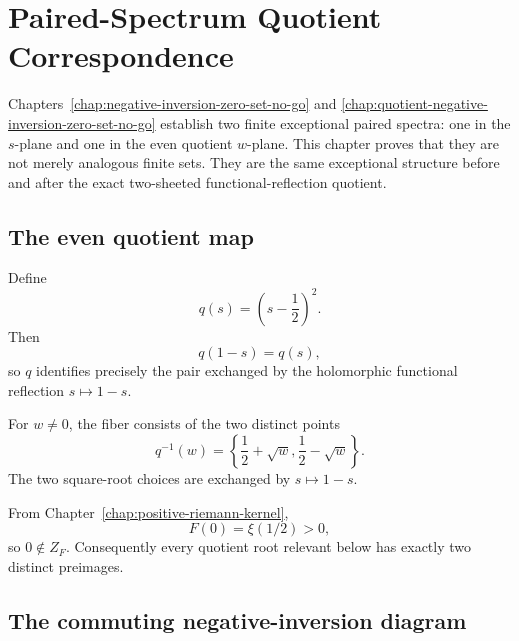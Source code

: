\chapter{Paired-Spectrum Quotient Correspondence}
\label{chap:paired-spectrum-quotient-correspondence}


Chapters~\ref{chap:negative-inversion-zero-set-no-go} and
\ref{chap:quotient-negative-inversion-zero-set-no-go} establish two finite
exceptional paired spectra: one in the $s$-plane and one in the even quotient
$w$-plane.  This chapter proves that they are not merely analogous finite
sets.  They are the same exceptional structure before and after the exact
two-sheeted functional-reflection quotient.

\section{The even quotient map}

Define
\begin{equation}
 q(s)=\left(s-\frac12\right)^2.
 \label{eq:g016-q}
\end{equation}
Then
\begin{equation}
 q(1-s)=q(s),
 \label{eq:g016-reflection-quotient}
\end{equation}
so $q$ identifies precisely the pair exchanged by the holomorphic functional
reflection $s\mapsto1-s$.

For $w\ne0$, the fiber consists of the two distinct points
\begin{equation}
 q^{-1}(w)
 =\left\{\frac12+\sqrt w,\frac12-\sqrt w\right\}.
 \label{eq:g016-fiber}
\end{equation}
The two square-root choices are exchanged by $s\mapsto1-s$.

From Chapter~\ref{chap:positive-riemann-kernel},
\begin{equation}
 F(0)=\xi(1/2)>0,
 \label{eq:g016-zero-not-root}
\end{equation}
so $0\notin Z_F$.  Consequently every quotient root relevant below has
exactly two distinct preimages.

\section{The commuting negative-inversion diagram}

